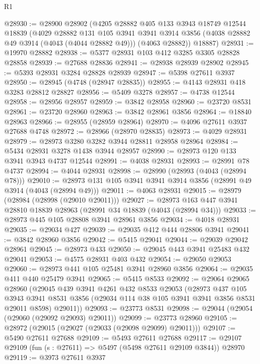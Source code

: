\begin{lexlean}{R1}
\begin{coremodule}
@28930 := @28900
    @28902
    (@4205
      @28882
      @405
      @133
      @3943
      @18749
      @12544
      @18839
      (@4029
        @28882
        @131
        @105
        @3941
        @3941
        @3914
        @3856
        (@4038 @28882 @49 @3914 (@4043 (@4044 @28882 @49)))
        (@4063 @28882))
      @18887)
@28931 := @19970 @28882
@28938 := @5377 @28931 @103 @412 @3285 @3305 @28828 @28858
@28939 := @27688 @28836
@28941 := @28938 @28939 @28902
@28945 := @5393 @28931 @3284 @28828 @28939
@28947 := @5398 @27611 @3937
@28950 := @28945 (@4748 (@28947 @28835))
@28955 := @4143 @28931 @418 @3283 @28812 @28827
@28956 := @5409 @3278
@28957 := @4738 @12544
@28958 := @28956 @28957
@28959 := @3842 @28958
@28960 := @23720 @8531
@28961 := @23720 @28960
@28963 := @3842 @28961 @3856
@28964 := @18840 @28963
@28966 := @28955 (@28959 @28964)
@28970 := @4096 @27611 @3937 @27688 @4748
@28972 := @28966 (@28970 @28835)
@28973 := @4029 @28931
@28979 := @28973 @3280 @3282 @3944 @28811 @28958 @28964
@28984 := @5434 @28931 @3278 @1438 @3944 @28957
@28990 := @28973 @120 @133 @3941 @3943 @4737 @12544
@28991 := @4038 @28931
@28993 := @28991 @78 @4737
@28994 := @4044 @28931
@28998 := @28990 (@28993 (@4043 (@28994 @78)))
@29010 := @28973 @131 @105 @3941 @3941 @3914 @3856 (@28991 @49 @3914 (@4043 (@28994 @49)))
@29011 := @4063 @28931
@29015 := @28979 (@28984 (@28998 (@29010 @29011)))
@29027 := @28973 @163 @447 @3941 @28810 @18839 @28963 (@28991 @34 @18839 (@4043 (@28994 @34)))
@29033 := @28973 @445 @105 @28808 @3941 @28961 @3856
@29034 := @4018 @28931
@29035 := @29034 @427
@29039 := @29035 @412 @444 @28806 @3941
@29041 := @3842 @28960 @3856
@29042 := @5415 @29041
@29044 := @29039 @29042 @28961
@29045 := @28973 @433
@29050 := @29045 @443 @3941 @25483 @432 @29041
@29053 := @4575 @28931 @403 @432
@29054 := @29050 @29053
@29060 := @28973 @441 @105 @25481 @3941 @28960 @3856
@29064 := @29035 @411 @440 @25479 @3941
@29065 := @5415 @8533
@29092 := @29064
    @29065
    @28960
    (@29045
      @439
      @3941
      @4261
      @432
      @8533
      @29053
      (@28973
        @437
        @105
        @3943
        @3941
        @8531
        @3856
        (@29034 @114 @38 @105 @3941 @3941 @3856 @8531 @29011 @8598)
        @29011))
@29093 := @23773 @8531
@29098 := @29044 (@29054 (@29060 (@29092 @29093) @29011))
@29099 := @23773 @28960
@29105 := @28972 (@29015 (@29027 (@29033 (@29098 @29099) @29011)))
@29107 := @5490 @27611 @27688
@29109 := @5493 @27611 @27688
@29117 := @29107 @29109 (fun (s : @27611) => @5497 (@5498 @27611 @29109 @3844)) @28970
@29119 := @3973 @27611 @3937

\end{coremodule}
\end{lexlean}
